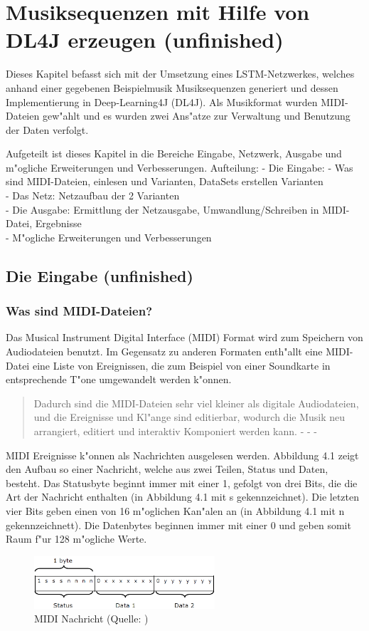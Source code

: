 \chapter{Musiksequenzen mit Hilfe von DL4J erzeugen (unfinished)}
{
Dieses Kapitel befasst sich mit der Umsetzung eines LSTM-Netzwerkes, welches anhand einer gegebenen Beispielmusik Musiksequenzen generiert und dessen Implementierung in Deep-Learning4J (DL4J). Als Musikformat wurden MIDI-Dateien gew"ahlt und es wurden zwei Ans"atze zur Verwaltung und Benutzung der Daten verfolgt.

Aufgeteilt ist dieses Kapitel in die Bereiche Eingabe, Netzwerk, Ausgabe und m"ogliche Erweiterungen und Verbesserungen.
Aufteilung:
- Die Eingabe: - Was sind MIDI-Dateien, einlesen und Varianten, DataSets erstellen Varianten\\
- Das Netz: Netzaufbau der 2 Varianten\\
- Die Ausgabe: Ermittlung der Netzausgabe, Umwandlung/Schreiben in MIDI-Datei, Ergebnisse\\
- M"ogliche Erweiterungen und Verbesserungen


\section{Die Eingabe (unfinished)}

\subsection{Was sind MIDI-Dateien?}
Das Musical Instrument Digital Interface (MIDI) Format wird zum Speichern von Audiodateien benutzt. Im Gegensatz zu anderen Formaten enth"allt eine MIDI-Datei eine Liste von Ereignissen, die zum Beispiel von einer Soundkarte in entsprechende T"one umgewandelt werden k"onnen. 
\begin{quote}{\glqq}Dadurch sind die MIDI-Dateien sehr viel kleiner als digitale Audiodateien, und die Ereignisse und Kl"ange sind editierbar, wodurch die Musik neu arrangiert, editiert und interaktiv Komponiert werden kann.{\grqq} - - - \cite{ITwissen}\end{quote} 
MIDI Ereignisse k"onnen als Nachrichten ausgelesen werden. Abbildung 4.1 zeigt den Aufbau so einer Nachricht, welche aus zwei Teilen, Status und Daten, besteht. Das Statusbyte beginnt immer mit einer 1, gefolgt von drei Bits, die die Art der Nachricht enthalten (in Abbildung 4.1 mit s gekennzeichnet). Die letzten vier Bits geben einen von 16 m"oglichen Kan"alen an (in Abbildung 4.1 mit n gekennzeichnett).
Die Datenbytes beginnen immer mit einer 0 und geben somit Raum f"ur 128  m"ogliche Werte.
\renewcommand{\figurename}{Abb.}
\begin{figure}[htp]
\centering
\includegraphics[width=0.60\textwidth]{pictures/MIDI-Message.png}
\caption[MIDI Nachricht]{MIDI Nachricht (Quelle: \cite{MIDIImg})}
\end{figure}

}
